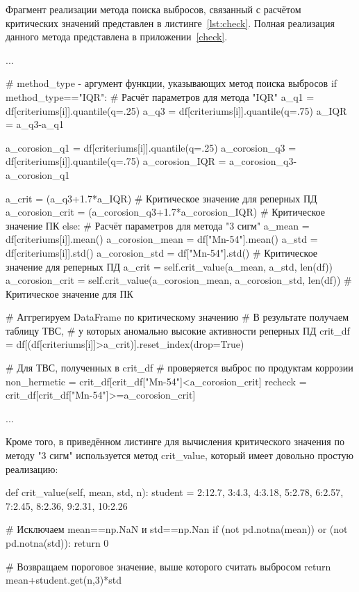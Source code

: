 Фрагмент реализации метода поиска выбросов, связанный с расчётом критических значений представлен в листинге~\ref{lst:check}. Полная реализация данного метода представлена в приложении~\ref{check}.

\begin{flushleft}
 \label{lst:check}
\begin{MyCodes}
...

# method_type - аргумент функции, указывающих метод поиска выбросов
if method_type=="IQR":
	# Расчёт параметров для метода "IQR"
	a_q1 = df[criteriums[i]].quantile(q=.25)
	a_q3 = df[criteriums[i]].quantile(q=.75)
	a_IQR = a_q3-a_q1
	
	a_corosion_q1 = df[criteriums[i]].quantile(q=.25)
	a_corosion_q3 = df[criteriums[i]].quantile(q=.75)
	a_corosion_IQR = a_corosion_q3-a_corosion_q1
	
	a_crit = (a_q3+1.7*a_IQR) # Критическое значение для реперных ПД
	a_corosion_crit = (a_corosion_q3+1.7*a_corosion_IQR) # Критическое значение ПК
else:
	# Расчёт параметров для метода "3 сигм"
	a_mean = df[criteriums[i]].mean()
	a_corosion_mean = df["Mn-54"].mean()
	a_std = df[criteriums[i]].std()
	a_corosion_std = df["Mn-54"].std() # Критическое значение для реперных ПД
	a_crit = self.crit_value(a_mean, a_std, len(df))
	a_corosion_crit = self.crit_value(a_corosion_mean,
		a_corosion_std, len(df)) # Критическое значение для ПК

# Аггрегируем DataFrame по критическому значению
# В результате получаем таблицу ТВС, 
# у которых аномально высокие активности реперных ПД
crit_df = df[(df[criteriums[i]]>a_crit)].reset_index(drop=True)

# Для ТВС, полученных в crit_df
# проверяется выброс по продуктам коррозии
non_hermetic = crit_df[crit_df["Mn-54"]<a_corosion_crit]
recheck = crit_df[crit_df["Mn-54"]>=a_corosion_crit]

...
\end{MyCodes}
\end{flushleft}

Кроме того, в приведённом листинге для вычисления критического значения по методу "3 сигм" используется метод crit\_value, который имеет довольно простую реализацию:

\begin{flushleft}
 \label{lst:сrit_value}
\begin{MyCodes}
	
def crit_value(self, mean, std, n):
	student = {2:12.7, 3:4.3, 4:3.18, 5:2.78, 6:2.57, 7:2.45, 8:2.36, 9:2.31, 10:2.26}
	
	# Исключаем mean==np.NaN и std==np.Nan
	if (not pd.notna(mean)) or (not pd.notna(std)): return 0
	
	# Возвращаем пороговое значение, выше которого считать выбросом
	return mean+student.get(n,3)*std
	
\end{MyCodes}
\end{flushleft}

